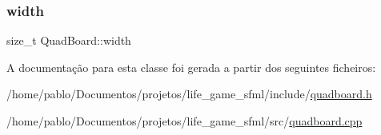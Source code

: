 \mbox{\label{classQuadBoard_a2e816c0a22fdaaf5efe57d4f05927f15}} 
\subsubsection{\texorpdfstring{width}{width}}
{\footnotesize\ttfamily size\+\_\+t Quad\+Board\+::width\hspace{0.3cm}{\ttfamily [private]}}



A documentação para esta classe foi gerada a partir dos seguintes ficheiros\+:\begin{DoxyCompactItemize}
\item 
/home/pablo/\+Documentos/projetos/life\+\_\+game\+\_\+sfml/include/\hyperlink{quadboard_8h}{quadboard.\+h}\item 
/home/pablo/\+Documentos/projetos/life\+\_\+game\+\_\+sfml/src/\hyperlink{quadboard_8cpp}{quadboard.\+cpp}\end{DoxyCompactItemize}
